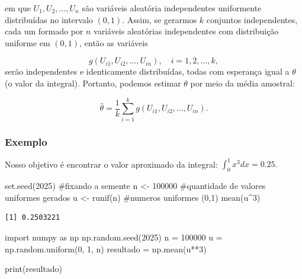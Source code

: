 \documentclass[
  letterpaper,
  DIV=11,
  numbers=noendperiod]{scrreprt}
\newenvironment{Shaded}{\begin{snugshade}}{\end{snugshade}}
\newcommand{\BuiltInTok}[1]{\textcolor[rgb]{0.00,0.23,0.31}{#1}}
\newcommand{\CommentTok}[1]{\textcolor[rgb]{0.37,0.37,0.37}{#1}}
\newcommand{\DecValTok}[1]{\textcolor[rgb]{0.68,0.00,0.00}{#1}}
\newcommand{\FunctionTok}[1]{\textcolor[rgb]{0.28,0.35,0.67}{#1}}
\newcommand{\ImportTok}[1]{\textcolor[rgb]{0.00,0.46,0.62}{#1}}
\newcommand{\NormalTok}[1]{\textcolor[rgb]{0.00,0.23,0.31}{#1}}
\newcommand{\OperatorTok}[1]{\textcolor[rgb]{0.37,0.37,0.37}{#1}}
\newcommand{\OtherTok}[1]{\textcolor[rgb]{0.00,0.23,0.31}{#1}}
\newcommand{\SpecialCharTok}[1]{\textcolor[rgb]{0.37,0.37,0.37}{#1}}
\begin{document}
em que \(U_1, U_2, \dots, U_n\) são variáveis aleatória independentes
uniformente distribuídas no intervalo \((0, 1)\). Assim, se gerarmos
\(k\) conjuntos independentes, cada um formado por \(n\) variáveis
aleatórias independentes com distribuição uniforme em \((0, 1)\), então
as variáveis

\[g(U_{i1}, U_{i2}, \dots, U_{in}), \quad i = 1, 2, \dots, k,\] serão
independentes e identicamente distribuídas, todas com esperança igual a
\(\theta\) (o valor da integral). Portanto, podemos estimar \(\theta\)
por meio da média amostral:

\[\hat{\theta} = \frac{1}{k}\sum\limits_{i=1}^{k}g(U_{i1}, U_{i2}, \dots, U_{in}).\]

\subsubsection*{Exemplo}\label{exemplo}

Nosso objetivo é encontrar o valor aproximado da integral:
\(\int_{0}^{1} x^3 dx = 0.25.\)

\begin{Shaded}
\begin{Highlighting}[]
\FunctionTok{set.seed}\NormalTok{(}\DecValTok{2025}\NormalTok{) }\CommentTok{\#fixando a semente}
\NormalTok{n }\OtherTok{\textless{}{-}} \DecValTok{100000} \CommentTok{\#quantidade de valores uniformes gerados}
\NormalTok{u }\OtherTok{\textless{}{-}} \FunctionTok{runif}\NormalTok{(n) }\CommentTok{\#numeros uniformes (0,1)}
\FunctionTok{mean}\NormalTok{(u}\SpecialCharTok{\^{}}\DecValTok{3}\NormalTok{)}
\end{Highlighting}
\end{Shaded}

\begin{verbatim}
[1] 0.2503221
\end{verbatim}

\begin{Shaded}
\begin{Highlighting}[]
\ImportTok{import}\NormalTok{ numpy }\ImportTok{as}\NormalTok{ np}
\NormalTok{np.random.seed(}\DecValTok{2025}\NormalTok{)}
\NormalTok{n }\OperatorTok{=} \DecValTok{100000}
\NormalTok{u }\OperatorTok{=}\NormalTok{ np.random.uniform(}\DecValTok{0}\NormalTok{, }\DecValTok{1}\NormalTok{, n)}
\NormalTok{resultado }\OperatorTok{=}\NormalTok{ np.mean(u}\OperatorTok{**}\DecValTok{3}\NormalTok{)}

\BuiltInTok{print}\NormalTok{(resultado)}
\end{Highlighting}
\end{Shaded}
\end{document}
